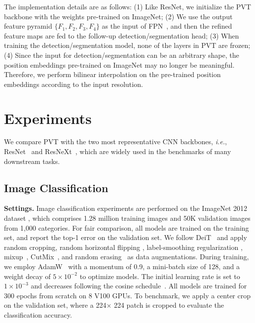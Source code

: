 \documentclass[10pt,twocolumn,letterpaper]{article}
\def\ie{\emph{i.e.}}
\begin{document}
The implementation details are as follows: 
(1) Like ResNet, we initialize the PVT backbone with the weights pre-trained on ImageNet;
(2) We use the output feature pyramid $\{F_1, F_2, F_3, F_4\}$ as the input of FPN~\cite{lin2017feature}, and then the refined feature maps are fed to the follow-up detection/segmentation head;
(3) When training the detection/segmentation model, none of the layers in PVT are frozen;
(4) Since the input for detection/segmentation can be an arbitrary shape, the position embeddings pre-trained on ImageNet may no longer be meaningful. Therefore, we perform bilinear interpolation on the pre-trained position embeddings according to the input resolution.


\section{Experiments}

We compare PVT with the two most representative CNN backbones, \ie, ResNet~\cite{he2016deep} and ResNeXt~\cite {xie2017aggregated}, which are widely used in the benchmarks of many downstream tasks.


\subsection{Image Classification}\label{sec:cls}


\noindent\textbf{Settings.}
Image classification experiments are performed on the ImageNet 2012 dataset \cite{russakovsky2015imagenet},
%
which comprises 1.28 million training images and 50K validation images from 1,000 categories. 
%
For fair comparison, all models are trained on the training set, and report the top-1 error on the validation set.
%
We follow DeiT~\cite{touvron2020training} and apply random cropping, random horizontal flipping \cite{szegedy2015going}, label-smoothing regularization \cite{szegedy2016rethinking}, mixup~\cite{zhang2017mixup}, CutMix~\cite{yun2019cutmix}, and random erasing~\cite{zhong2020random} as data augmentations.
%
During training, we employ AdamW~\cite{loshchilov2017decoupled} with a momentum of 0.9, a mini-batch size of 128, and a weight decay of $5\times 10^{-2}$ to optimize models. The initial learning rate is set to $1\times 10^{-3}$ and decreases following the cosine schedule~\cite{loshchilov2016sgdr}.  All models are trained for 300 epochs from scratch on 8 V100 GPUs.
%
To benchmark, we apply a center crop on the validation set, where a 224$\times$ 224 patch is cropped to evaluate the classification accuracy. 
\end{document}
